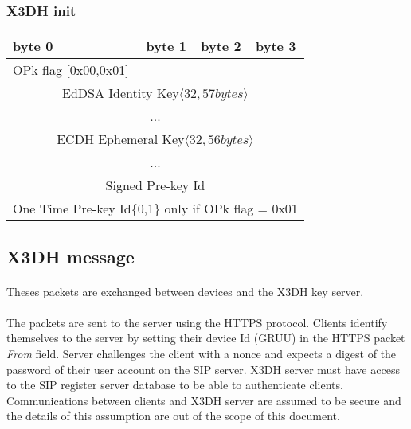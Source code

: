 \documentclass[a4paper,11pt]{article}
\begin{document}
      \subsubsection{X3DH init}
      \begin{center}
      \begin{tabular}{ | p{1.4in} | p{1.4in} | p{1.4in} | p{1.4in} |}
        \hline
        \cellcolor[gray]{0.85} byte 0 & \cellcolor[gray]{0.85} byte 1 & \cellcolor[gray]{0.85} byte 2 & \cellcolor[gray]{0.85}byte 3\\
        \hline
        OPk flag [0x00,0x01]&\multicolumn{3}{|c|}{}\\
        \cline{1-1}
        \multicolumn{4}{|c|}{EdDSA Identity Key$\langle 32,57bytes\rangle $}\\
        \multicolumn{4}{|c|}{...}\\
        \hline
        \multicolumn{4}{|c|}{ ECDH Ephemeral Key$\langle 32,56bytes\rangle $}\\
        \multicolumn{4}{|c|}{...}\\
        \hline
        \multicolumn{4}{|c|}{Signed Pre-key Id}\\
        \hline
        \multicolumn{4}{|c|}{One Time Pre-key Id\{0,1\} only if OPk flag = 0x01}\\
        \hline
      \end{tabular}
      \end{center}

  \subsection{X3DH message}
    \paragraph{}Theses packets are exchanged between devices and the X3DH key server.
    \paragraph*{}The packets are sent to the server using the HTTPS protocol. Clients identify themselves to the server by setting their device Id (GRUU) in the HTTPS packet \textit{From} field. Server challenges the client with a nonce and expects a digest of the password of their user account on the SIP server. X3DH server must have access to the SIP register server database to be able to authenticate clients. Communications between clients and X3DH server are assumed to be secure and the details of this assumption are out of the scope of this document.
\end{document}
